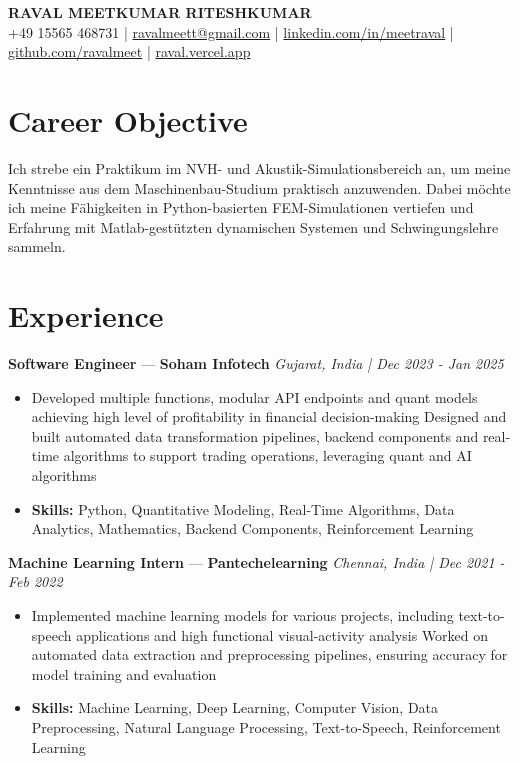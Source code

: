 \documentclass[a4paper,10pt]{article}
\begin{document}
\begin{center}
  {\Large\bfseries RAVAL MEETKUMAR RITESHKUMAR}\\[2pt]
  {\small +49 15565 468731 \;|\; \href{mailto:ravalmeett@gmail.com}{ravalmeett@gmail.com} \;|\; \href{https://www.linkedin.com/in/meetraval/}{linkedin.com/in/meetraval} \;|\; \href{https://github.com/ravalmeet}{github.com/ravalmeet} \;|\; \href{https://raval.vercel.app/}{raval.vercel.app}}
\end{center}
\vspace{-3pt}

\section*{Career Objective}
Ich strebe ein Praktikum im NVH- und Akustik-Simulationsbereich an, um meine Kenntnisse aus dem Maschinenbau-Studium praktisch anzuwenden. Dabei möchte ich meine Fähigkeiten in Python-basierten FEM-Simulationen vertiefen und Erfahrung mit Matlab-gestützten dynamischen Systemen und Schwingungslehre sammeln.\par

\section*{Experience}
\textbf{Software Engineer} — \textbf{Soham Infotech} \hfill \textit{Gujarat, India \;|\; Dec 2023 - Jan 2025}\par
\vspace{1pt}
\begin{itemize}
  \item Developed multiple functions, modular API endpoints and quant models achieving high level of profitability in financial decision-making Designed and built automated data transformation pipelines, backend components and real-time algorithms to support trading operations, leveraging quant and AI algorithms
  \item \textbf{Skills:} Python, Quantitative Modeling, Real-Time Algorithms, Data Analytics, Mathematics, Backend Components, Reinforcement Learning
\end{itemize}
\vspace{3pt}
\textbf{Machine Learning Intern} — \textbf{Pantechelearning} \hfill \textit{Chennai, India \;|\; Dec 2021 - Feb 2022}\par
\vspace{1pt}
\begin{itemize}
  \item Implemented machine learning models for various projects, including text-to-speech applications and high functional visual-activity analysis Worked on automated data extraction and preprocessing pipelines, ensuring accuracy for model training and evaluation
  \item \textbf{Skills:} Machine Learning, Deep Learning, Computer Vision, Data Preprocessing, Natural Language Processing, Text-to-Speech, Reinforcement Learning
\end{itemize}
\end{document}
